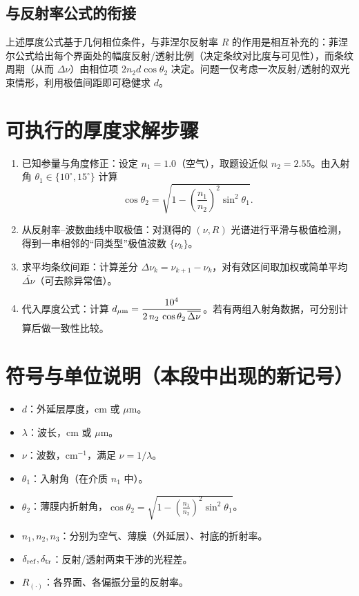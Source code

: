 \documentclass[withoutpreface,bwprint]{cumcmthesis} %
\begin{document}
\subsection{与反射率公式的衔接}
上述厚度公式基于几何相位条件，与菲涅尔反射率 \(R\) 的作用是相互补充的：菲涅尔公式给出每个界面处的幅度反射/透射比例（决定条纹对比度与可见性），而条纹周期（从而 \(\Delta\nu\)）由相位项 \(2n_2 d \cos\theta_2\) 决定。问题一仅考虑一次反射/透射的双光束情形，利用极值间距即可稳健求 \(d\)。

\section{可执行的厚度求解步骤}
\begin{enumerate}
    \item 已知参量与角度修正：设定 \(n_1=1.0\)（空气），取题设近似 \(n_2=2.55\)。由入射角 \(\theta_1 \in \{10^\circ, 15^\circ\}\) 计算
          \[
              \cos\theta_2=\sqrt{1-\left(\frac{n_1}{n_2}\right)^2\sin^2\theta_1}.
          \]
    \item 从反射率–波数曲线中取极值：对测得的 \((\nu, R)\) 光谱进行平滑与极值检测，得到一串相邻的“同类型”极值波数 \(\{\nu_k\}\)。
    \item 求平均条纹间距：计算差分 \(\Delta \nu_k=\nu_{k+1}-\nu_k\)，对有效区间取加权或简单平均 \(\overline{\Delta\nu}\)（可去除异常值）。
    \item 代入厚度公式：计算 \(d_{\mu{\rm m}}=\dfrac{10^4}{2\,n_2\,\cos\theta_2\,\overline{\Delta\nu}}\)。若有两组入射角数据，可分别计算后做一致性比较。
\end{enumerate}

\section{符号与单位说明（本段中出现的新记号）}
\begin{itemize}
    \item \(d\)：外延层厚度，cm 或 \(\mu\)m。
    \item \(\lambda\)：波长，cm 或 \(\mu\)m。
    \item \(\nu\)：波数，cm\(^{-1}\)，满足 \(\nu=1/\lambda\)。
    \item \(\theta_1\)：入射角（在介质 \(n_1\) 中）。
    \item \(\theta_2\)：薄膜内折射角，\(\cos\theta_2=\sqrt{1-(\tfrac{n_1}{n_2})^2\sin^2\theta_1}\)。
    \item \(n_1,n_2,n_3\)：分别为空气、薄膜（外延层）、衬底的折射率。
    \item \(\delta_{\rm ref},\delta_{\rm tr}\)：反射/透射两束干涉的光程差。
    \item \(R_{(\cdot)}\)：各界面、各偏振分量的反射率。
\end{itemize}
\end{document}
